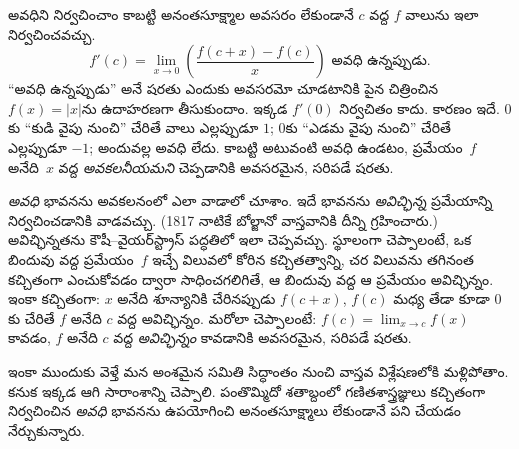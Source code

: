 \documentclass[../../../include/open-logic-section]{subfiles}
\begin{document}
అవధిని నిర్వచించాం కాబట్టి అనంతసూక్ష్మాల అవసరం లేకుండానే $c$ వద్ద $f$ వాలును ఇలా నిర్వచించవచ్చు.
\[
	{f}'(c) = \lim_{x \rightarrow 0}\left(\frac{f(c +x) - f(c)}{x}\right) \text{ అవధి ఉన్నప్పుడు}.
\]
``అవధి ఉన్నప్పుడు'' అనే షరతు ఎందుకు అవసరమో చూడటానికి పైన చిత్రించిన $f(x) = |x|$ను ఉదాహరణగా తీసుకుందాం. ఇక్కడ $f'(0)$ నిర్వచితం కాదు. కారణం ఇదే. $0$కు ``కుడి వైపు నుంచి'' చేరితే వాలు ఎల్లప్పుడూ $1$; $0$కు ``ఎడమ వైపు నుంచి'' చేరితే ఎల్లప్పుడూ $-1$; అందువల్ల అవధి లేదు. కాబట్టి అటువంటి అవధి ఉండటం, ప్రమేయం~$f$ అనేది~$x$ వద్ద \emph{అవకలనీయమని} చెప్పడానికి అవసరమైన, సరిపడే షరతు.

\emph{అవధి} భావనను అవకలనంలో ఎలా వాడాలో చూశాం. ఇదే భావనను \emph{అవిచ్ఛిన్న} ప్రమేయాన్ని నిర్వచించడానికి వాడవచ్చు. (1817 నాటికే బోల్జానో వాస్తవానికి దీన్ని గ్రహించారు.) అవిచ్ఛిన్నతను కౌషీ--వైయర్‌స్ట్రాస్ పద్ధతిలో ఇలా చెప్పవచ్చు. స్థూలంగా చెప్పాలంటే, ఒక బిందువు వద్ద ప్రమేయం~$f$ ఇచ్చే విలువలో కోరిన కచ్చితత్వాన్ని, చర విలువను తగినంత కచ్చితంగా ఎంచుకోవడం ద్వారా సాధించగలిగితే, ఆ బిందువు వద్ద ఆ ప్రమేయం అవిచ్ఛిన్నం. ఇంకా కచ్చితంగా: $x$ అనేది శూన్యానికి చేరినప్పుడు $f(c + x)$, $f(c)$ మధ్య తేడా కూడా $0$కు చేరితే $f$ అనేది $c$ వద్ద అవిచ్ఛిన్నం. మరోలా చెప్పాలంటే: $f(c) = \lim_{x \rightarrow c} f(x)$ కావడం, $f$ అనేది $c$ వద్ద \emph{అవిచ్ఛిన్నం} కావడానికి అవసరమైన, సరిపడే షరతు.

ఇంకా ముందుకు వెళ్తే మన అంశమైన సమితి సిద్ధాంతం నుంచి వాస్తవ విశ్లేషణలోకి మళ్లిపోతాం. కనుక ఇక్కడ ఆగి సారాంశాన్ని చెప్పాలి. పంతొమ్మిదో శతాబ్దంలో గణితశాస్త్రజ్ఞులు కచ్చితంగా నిర్వచించిన \emph{అవధి} భావనను ఉపయోగించి అనంతసూక్ష్మాలు లేకుండానే పని చేయడం నేర్చుకున్నారు.
\end{document}
